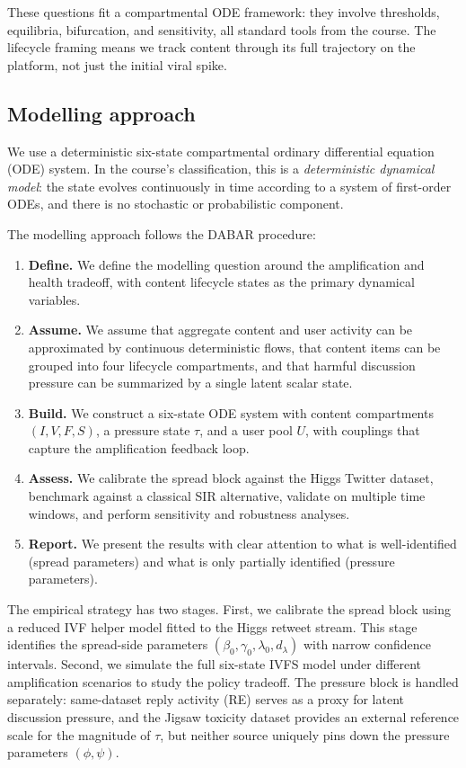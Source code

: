 \documentclass[11pt]{article}
\begin{document}
These questions fit a compartmental ODE framework: they involve thresholds, equilibria, bifurcation, and sensitivity, all standard tools from the course. The lifecycle framing means we track content through its full trajectory on the platform, not just the initial viral spike.


\subsection{Modelling approach}
\label{sec:approach}

We use a deterministic six-state compartmental ordinary differential equation (ODE) system. In the course's classification, this is a \emph{deterministic dynamical model}: the state evolves continuously in time according to a system of first-order ODEs, and there is no stochastic or probabilistic component.

The modelling approach follows the DABAR procedure:
\begin{enumerate}[leftmargin=1.5em]
    \item \textbf{Define.} We define the modelling question around the amplification and health tradeoff, with content lifecycle states as the primary dynamical variables.
    \item \textbf{Assume.} We assume that aggregate content and user activity can be approximated by continuous deterministic flows, that content items can be grouped into four lifecycle compartments, and that harmful discussion pressure can be summarized by a single latent scalar state.
    \item \textbf{Build.} We construct a six-state ODE system with content compartments $(I,V,F,S)$, a pressure state $\tau$, and a user pool $U$, with couplings that capture the amplification feedback loop.
    \item \textbf{Assess.} We calibrate the spread block against the Higgs Twitter dataset, benchmark against a classical SIR alternative, validate on multiple time windows, and perform sensitivity and robustness analyses.
    \item \textbf{Report.} We present the results with clear attention to what is well-identified (spread parameters) and what is only partially identified (pressure parameters).
\end{enumerate}

The empirical strategy has two stages. First, we calibrate the spread block using a reduced IVF helper model fitted to the Higgs retweet stream. This stage identifies the spread-side parameters $(\beta_0, \gamma_0, \lambda_0, d_\lambda)$ with narrow confidence intervals. Second, we simulate the full six-state IVFS model under different amplification scenarios to study the policy tradeoff. The pressure block is handled separately: same-dataset reply activity (RE) serves as a proxy for latent discussion pressure, and the Jigsaw toxicity dataset provides an external reference scale for the magnitude of $\tau$, but neither source uniquely pins down the pressure parameters $(\phi, \psi)$.
\end{document}
